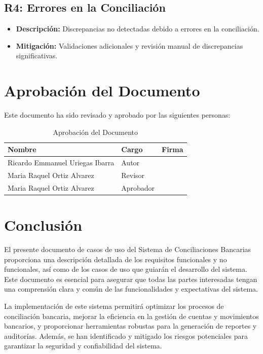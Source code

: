\documentclass{article}
\begin{document}
\subsection{R4: Errores en la Conciliación}
\begin{itemize}
    \item \textbf{Descripción:} Discrepancias no detectadas debido a errores en la conciliación.
    \item \textbf{Mitigación:} Validaciones adicionales y revisión manual de discrepancias significativas.
\end{itemize}

\newpage
\section{Aprobación del Documento}

Este documento ha sido revisado y aprobado por las siguientes personas:

\begin{table}[H]
\centering
\begin{tabular}{|l|l|l|}
\hline
\textbf{Nombre} & \textbf{Cargo} & \textbf{Firma} \\ \hline
Ricardo Emmanuel Uriegas Ibarra & Autor &  \\ \hline
Maria Raquel Ortiz Alvarez & Revisor &  \\ \hline
Maria Raquel Ortiz Alvarez & Aprobador &  \\ \hline
\end{tabular}
\caption{Aprobación del Documento}
\end{table}

\newpage
\section{Conclusión}

El presente documento de casos de uso del Sistema de Conciliaciones Bancarias proporciona una descripción detallada de los requisitos funcionales y no funcionales, así como de los casos de uso que guiarán el desarrollo del sistema. Este documento es esencial para asegurar que todas las partes interesadas tengan una comprensión clara y común de las funcionalidades y expectativas del sistema.

La implementación de este sistema permitirá optimizar los procesos de conciliación bancaria, mejorar la eficiencia en la gestión de cuentas y movimientos bancarios, y proporcionar herramientas robustas para la generación de reportes y auditorías. Además, se han identificado y mitigado los riesgos potenciales para garantizar la seguridad y confiabilidad del sistema.
\end{document}
